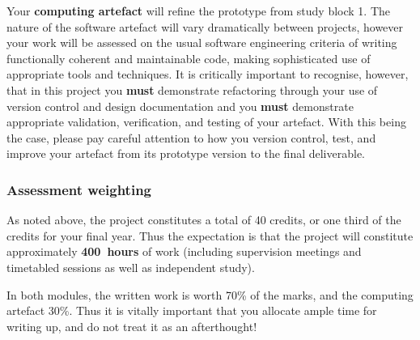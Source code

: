 Your \textbf{computing artefact} will refine the prototype from study block 1.
The nature of the software artefact will vary dramatically between projects,
however your work will be assessed on the usual software engineering criteria of writing
functionally coherent and maintainable code, making sophisticated use of appropriate tools and techniques.
It is critically important to recognise, however, that in this project you \textbf{must} demonstrate refactoring
through your use of version control and design documentation and you  \textbf{must} demonstrate appropriate
validation, verification, and testing of your artefact. With this being the case, please pay careful attention to 
how you version control, test, and improve your artefact from its prototype version to the final deliverable.

\subsubsection*{Assessment weighting}

As noted above, the project constitutes a total of 40 credits, or one third of the credits for your final year.
Thus the expectation is that the project will constitute approximately \textbf{400~hours} of work 
(including supervision meetings and timetabled sessions as well as independent study).

In both modules, the written work is worth 70\% of the marks, and the computing artefact 30\%.
Thus it is vitally important that you allocate ample time for writing up, and do not treat it as an afterthought!

